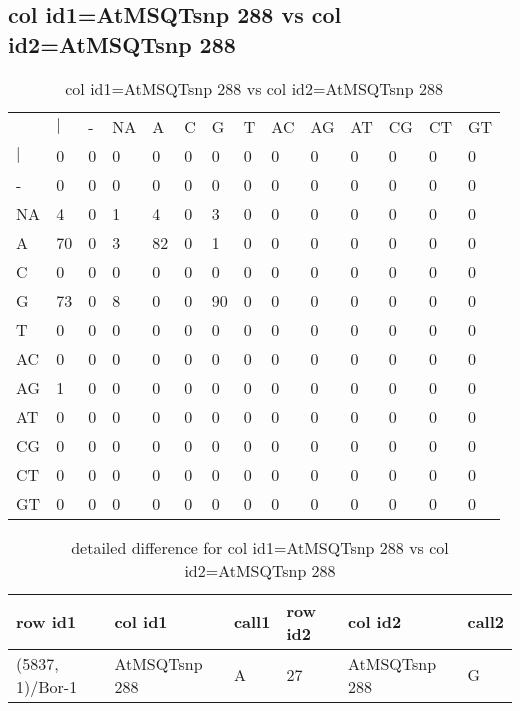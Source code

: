 \subsection{col id1=AtMSQTsnp 288 vs col id2=AtMSQTsnp 288}
\begin{center}
\begin{longtable}{|l|l|l|l|l|l|l|l|l|l|l|l|l|l|}
\caption{col id1=AtMSQTsnp 288 vs col id2=AtMSQTsnp 288} \label{table_dm824}\\
\hline
\\
\hline
&$|$&-&NA&A&C&G&T&AC&AG&AT&CG&CT&GT\\
$|$&0&0&0&0&0&0&0&0&0&0&0&0&0\\
-&0&0&0&0&0&0&0&0&0&0&0&0&0\\
NA&4&0&1&4&0&3&0&0&0&0&0&0&0\\
A&70&0&3&82&0&1&0&0&0&0&0&0&0\\
C&0&0&0&0&0&0&0&0&0&0&0&0&0\\
G&73&0&8&0&0&90&0&0&0&0&0&0&0\\
T&0&0&0&0&0&0&0&0&0&0&0&0&0\\
AC&0&0&0&0&0&0&0&0&0&0&0&0&0\\
AG&1&0&0&0&0&0&0&0&0&0&0&0&0\\
AT&0&0&0&0&0&0&0&0&0&0&0&0&0\\
CG&0&0&0&0&0&0&0&0&0&0&0&0&0\\
CT&0&0&0&0&0&0&0&0&0&0&0&0&0\\
GT&0&0&0&0&0&0&0&0&0&0&0&0&0\\
\hline
\end{longtable}
\end{center}

\begin{center}
\begin{longtable}{|l|l|l|l|l|l|}
\caption{detailed difference for col id1=AtMSQTsnp 288 vs col id2=AtMSQTsnp 288} \label{table_dm825}\\
\hline
row id1&col id1&call1&row id2&col id2&call2\\
\hline
(5837, 1)/Bor-1&AtMSQTsnp 288&A&27&AtMSQTsnp 288&G\\
\hline
\end{longtable}
\end{center}

